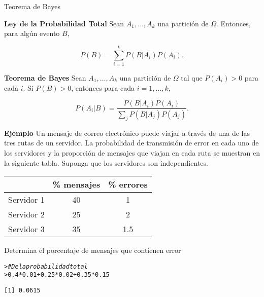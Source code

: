 \documentclass{article}\usepackage[]{graphicx}\usepackage[]{color}
\makeatletter
\newcommand{\hlnum}[1]{\textcolor[rgb]{0.686,0.059,0.569}{#1}}%
\newcommand{\hlcom}[1]{\textcolor[rgb]{0.678,0.584,0.686}{\textit{#1}}}%
\newcommand{\hlopt}[1]{\textcolor[rgb]{0,0,0}{#1}}%
\newcommand{\hlstd}[1]{\textcolor[rgb]{0.345,0.345,0.345}{#1}}%
\newenvironment{kframe}{%
 \def\at@end@of@kframe{}%
 \ifinner\ifhmode%
  \def\at@end@of@kframe{\end{minipage}}%
  \begin{minipage}{\columnwidth}%
 \fi\fi%
 \def\FrameCommand##1{\hskip\@totalleftmargin \hskip-\fboxsep
 \colorbox{shadecolor}{##1}\hskip-\fboxsep
     \hskip-\linewidth \hskip-\@totalleftmargin \hskip\columnwidth}%
 \MakeFramed {\advance\hsize-\width
   \@totalleftmargin\z@ \linewidth\hsize
   \@setminipage}}%
 {\par\unskip\endMakeFramed%
 \at@end@of@kframe}
\newenvironment{knitrout}{}{} %
\makeatother
\begin{document}
{\Large Teorema de Bayes}

\vspace{0.6cm}

\textbf{Ley de la Probabilidad Total} Sean $A_1, \dots, A_k$ una partici\'on de $\Omega$. Entonces, para alg\'un evento $B$,

\[
P(B) = \sum_{i = 1}^{k}P(B|A_i)P(A_i).
\]


\vspace{0.4cm}

\textbf{Teorema de Bayes} Sean $A_1, \dots, A_k$ una partici\'on de $\Omega$ tal que $P(A_i) > 0$ para cada $i$. Si $P(B)  > 0$, entonces para cada $i = 1, \dots, k$,

\[
P(A_i|B) = \frac{P(B|A_i)P(A_i)}{\sum_{j}P(B|A_j)P(A_j)}.
\]

\vspace{0.5cm}

\textbf{Ejemplo} Un mensaje de correo electr\'onico puede viajar a trav\'es de una de las tres rutas de un  servidor. La probabilidad de transmisi\'on de error en cada uno de los servidores y la proporci\'on de mensajes que viajan en  cada ruta se muestran en la siguiente tabla. Suponga que los servidores son independientes.

\begin{table}[h]
\begin{center}
\begin{tabular}{|c|c|c|}
\hline
           & \% mensajes & \% errores \\ \hline
Servidor 1 & 40          & 1          \\ \hline
Servidor 2 & 25          & 2          \\ \hline
Servidor 3 & 35          & 1.5        \\ \hline
\end{tabular}
\end{center}
\end{table}

Determina el porcentaje de mensajes que contienen error


\begin{knitrout}
\color{fgcolor}\begin{kframe}
\begin{alltt}
\hlstd{> }\hlcom{# De la probabilidad total }
\hlstd{> }\hlnum{0.4} \hlopt{*} \hlnum{0.01} \hlopt{+} \hlnum{0.25}\hlopt{*}\hlnum{0.02} \hlopt{+} \hlnum{0.35}\hlopt{*}\hlnum{0.15}
\end{alltt}
\begin{verbatim}
[1] 0.0615
\end{verbatim}
\end{kframe}
\end{knitrout}
\end{document}
